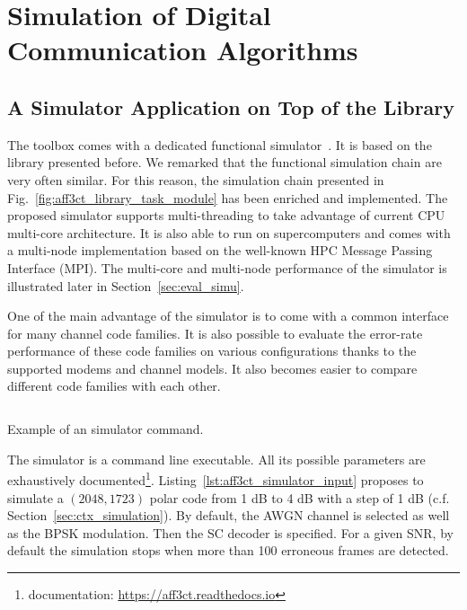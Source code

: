 \section{Simulation of Digital Communication Algorithms}

\subsection{A Simulator Application on Top of the Library}
\label{sec:aff3ct_simulator_example}

The \AFFECT toolbox comes with a dedicated functional
simulator~\cite{Cassagne2017}. It is based on the \AFFECT library presented
before. We remarked that the functional simulation chain are very often similar.
For this reason, the simulation chain presented in
Fig.~\ref{fig:aff3ct_library_task_module} has been enriched and implemented. The
proposed simulator supports multi-threading to take advantage of current CPU
multi-core architecture. It is also able to run on supercomputers and comes with
a multi-node implementation based on the well-known HPC Message Passing
Interface (MPI). The multi-core and multi-node performance of the \AFFECT
simulator is illustrated later in Section~\ref{sec:eval_simu}.

One of the main advantage of the \AFFECT simulator is to come with a common
interface for many channel code families. It is also possible to evaluate the
error-rate performance of these code families on various configurations thanks
to the supported modems and channel models. It also becomes easier to compare
different code families with each other.

\begin{listing}[htp]
  \inputminted[frame=lines]{bash}{\curChapter/src/use_cases/simulator/input.txt}
  \caption{Example of an \AFFECT simulator command.}
  \label{lst:aff3ct_simulator_input}
\end{listing}

The \AFFECT simulator is a command line executable. All its possible parameters
are exhaustively documented\footnote{\AFFECT documentation:
\url{https://aff3ct.readthedocs.io}}. Listing~\ref{lst:aff3ct_simulator_input}
proposes to simulate a $(2048,1723)$ polar code from 1 dB to 4 dB with a step of
1 dB (c.f. Section~\ref{sec:ctx_simulation}). By default, the AWGN channel is
selected as well as the BPSK modulation. Then the SC decoder is specified. For a
given SNR, by default the simulation stops when more than 100 erroneous frames
are detected.

